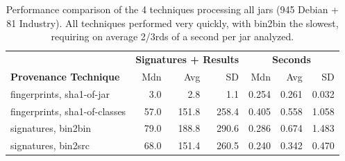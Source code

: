 \begin{table}[h]
\centering
\begin{tabular}[htbp]{l|rrr|rrr}
& \multicolumn{3}{c|}{\textbf{Signatures + Results}}  & \multicolumn{3}{c}{\textbf{Seconds}} \\
\textbf{Provenance Technique}     & Mdn   & Avg    & SD    & Mdn  & Avg  & SD  \\
\hline
fingerprints, sha1-of-jar         &  3.0  &   2.8  &   1.1 & 0.254  & 0.261  & 0.032   \\
fingerprints, sha1-of-classes     & 57.0  & 151.8  & 258.4 & 0.405  & 0.558  & 1.058   \\
signatures, bin2bin               & 79.0  & 188.8  & 290.6 & 0.286  & 0.674  & 1.483   \\
signatures, bin2src               & 68.0  & 151.4  & 260.5 & 0.240  & 0.342  & 0.470   \\
\hline
\end{tabular}
\caption{Performance comparison of the 4 techniques processing all jars
(945 Debian + 81 Industry).  All techniques
performed very quickly, with bin2bin the slowest, requiring on average 2/3rds of a second
per jar analyzed.}

\label{tab:perfSummary}
\end{table}




